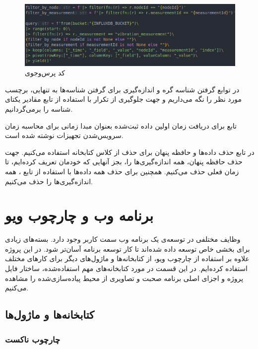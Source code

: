 \begin{figure}[!h]
\centering\includegraphics[scale=.75]{vm_query.png}
\caption{کد پرس‌وجوی }\label{fig:vm_query}
\end{figure}


در توابع گرفتن شناسه گره و اندازه‌گیری برای گرفتن شناسه‌ها به تنهایی، برچسب مورد نظر را نگه می‌داریم و جهت جلوگیری از تکرار با استفاده از تابع  مقادیر یکتای شناسه را برمی‌گردانیم.


تابع  برای دریافت زمان اولین داده ثبت‌شده بعنوان مبدا زمانی برای محاسبه زمان سرویس‌شدن تجهیزات نوشته شده است.


در تابع حذف داده‌ها و حافظه پنهان برای حذف از کلاس  کتابخانه استفاده می‌کنیم. جهت حذف حافظه پنهان، همه اندازه‌گیری‌ها را، بجز آنهایی که خودمان تعریف کرده‌ایم، تا زمان فعلی حذف می‌کنیم. همچنین برای حذف همه داده‌ها با استفاده از تابع ، همه اندازه‌گیری‌ها را حذف می‌کنیم.

\section{برنامه وب و چارچوب ویو}

وظایف مختلفی در توسعه‌ی یک برنامه وب سمت کاربر وجود دارد. بسته‌های زیادی برای بخشی خاص توسعه داده شده‌اند تا کار توسعه برنامه آسان‌تر شود. در این پروژه علاوه بر استفاده از چارچوب ویو، از کتابخانه‌ها و ماژول‌های دیگر برای کارهای مختلف استفاده کرده‌ایم. در این قسمت در مورد کتابخانه‌های مهم استفاده‌شده، ساختار فایل پروژه و اجزای اصلی برنامه صحبت و تصاویری از محیط پیاده‌سازی‌شده را مشاهده می‌کنیم.

\subsection{کتابخانه‌ها و ماژول‌ها}

\subsubsection{چارچوب ناکست}

